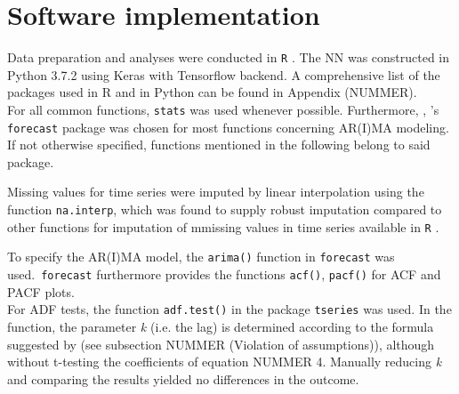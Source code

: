\documentclass[a4paper, 11pt]{article}
\begin{document}
\section{Software implementation}

Data preparation and analyses were conducted in \texttt{R} \citep{Team.2013}. The NN was constructed in Python 3.7.2 using Keras \citep{chollet2015keras} with Tensorflow \citep{tensorflow2015-whitepaper} backend. A comprehensive list of the packages used in R and in Python can be found in Appendix (NUMMER).\\

For all common functions, \texttt{stats} was used whenever possible. Furthermore, , \cite{Hyndman.2008}'s  \texttt{forecast} package was chosen for most functions concerning AR(I)MA modeling. If not otherwise specified, functions mentioned in the following belong to said package.

Missing values for time series were imputed by linear interpolation using the function \texttt{na.interp}, which was found to supply robust imputation compared to other functions for imputation of mmissing values in time series available in \texttt{R} \citep{Moritz2015ComparisonOD}. 

To specify the AR(I)MA model, the \texttt{arima()} function in \texttt{forecast} was used.\
\texttt{forecast} furthermore provides the functions \texttt{acf()}, \texttt{pacf()} for ACF and PACF plots. \\
For ADF tests, the function \texttt {adf.test()} in the package \texttt{tseries} was used. In the function, the parameter \textit{k} (i.e. the lag) is determined according to the formula suggested by \cite{Vogel.2015} (see subsection NUMMER (Violation of assumptions)), although without t-testing the coefficients of equation NUMMER 4. Manually reducing \textit{k} and comparing the results yielded no differences in the outcome.\\
\end{document}
